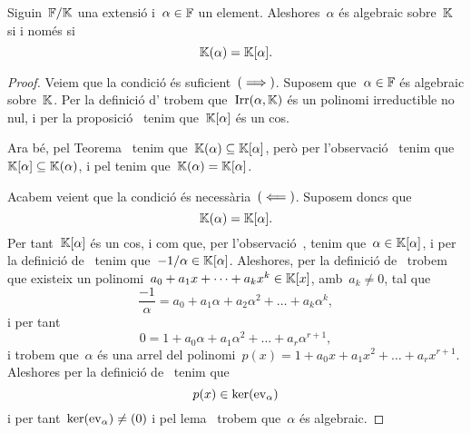 \documentclass[../Apunts.tex]{subfiles}
\begin{document}
	\begin{lemma}
		\label{lema:un element és algebraic si i només si el mínim subanell engendrat per l'element és un cos}
		Siguin~\(\mathbb{F}/\mathbb{K}\) una extensió i~\(\alpha\in\mathbb{F}\) un element. Aleshores~\(\alpha\) és algebraic sobre~\(\mathbb{K}\) si i només si
		\[\mathbb{K}(\alpha)=\mathbb{K}[\alpha].\]
		\begin{proof} %
			Veiem que la condició és suficient~\((\implies)\). Suposem que~\(\alpha\in\mathbb{F}\) és algebraic sobre~\(\mathbb{K}\). Per la definició d' trobem que~\(\operatorname{Irr}(\alpha,\mathbb{K})\) és un polinomi irreductible no nul, i per la proposició~ tenim que~\(\mathbb{K}[\alpha]\) és un cos.
			
			Ara bé, pel Teorema~ tenim que~\(\mathbb{K}(\alpha)\subseteq\mathbb{K}[\alpha]\), però per l'observació~ tenim que~\(\mathbb{K}[\alpha]\subseteq\mathbb{K}(\alpha)\), i pel  tenim que~\(\mathbb{K}(\alpha)=\mathbb{K}[\alpha]\).
			
			Acabem veient que la condició és necessària~\((\impliedby)\). Suposem doncs que
			\[\mathbb{K}(\alpha)=\mathbb{K}[\alpha].\]
			Per tant~\(\mathbb{K}[\alpha]\) és un cos, i com que, per l'observació~, tenim que~\(\alpha\in\mathbb{K}[\alpha]\), i per la definició de~ tenim que~\(-1/\alpha\in\mathbb{K}[\alpha]\). Aleshores, per la definició de~ trobem que existeix un polinomi~\(a_{0}+a_{1}x+\dots+a_{k}x^{k}\in\mathbb{K}[x]\), amb~\(a_{k}\neq0\), tal que
			\[\frac{-1}{\alpha}=a_{0}+a_{1}\alpha+a_{2}\alpha^{2}+\dots+a_{k}\alpha^{k},\]
			i per tant
			\[0=1+a_{0}\alpha+a_{1}\alpha^{2}+\dots+a_{r}\alpha^{r+1},\]
			i trobem que~\(\alpha\) és una arrel del polinomi~\(p(x)=1+a_{0}x+a_{1}x^{2}+\dots+a_{r}x^{r+1}\). Aleshores per la definició de~ tenim que
			\[p(x)\in\operatorname{ker}(\mathrm{ev}_{\alpha})\]
			i per tant~\(\operatorname{ker}(\mathrm{ev}_{\alpha})\neq(0)\) i pel lema~ trobem que~\(\alpha\) és algebraic.
		\end{proof}
	\end{lemma}
\end{document}
